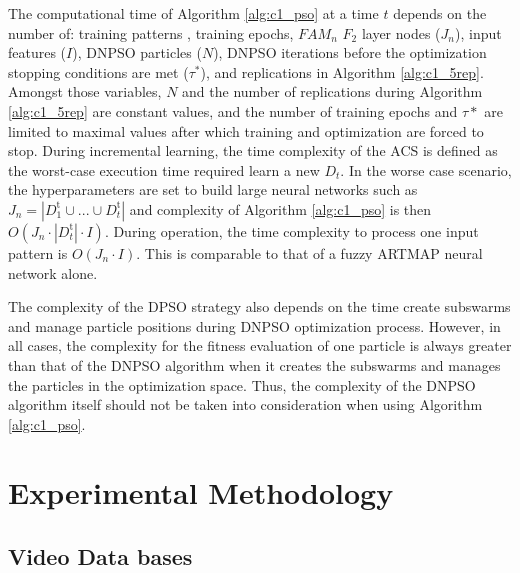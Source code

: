 The computational time of Algorithm \ref{alg:c1_pso} at a time $t$ depends on the number of: training patterns , training epochs, $\textit{FAM}_n$ $F_2$ layer nodes ($J_n$), input features ($I$), DNPSO particles ($N$), DNPSO iterations before the optimization stopping conditions are met ($\tau^*$), and replications in Algorithm \ref{alg:c1_5rep}. Amongst those variables, $N$ and the number of replications during Algorithm \ref{alg:c1_5rep} are constant values, and the number of training epochs and $\tau*$ are limited to maximal values after which training and optimization are forced to stop. During incremental learning, the time complexity of the ACS is defined as the worst-case execution time required learn a new $D_t$. In the worse case scenario, the hyperparameters are set to build large neural networks such as $J_n = |D_1^\text{t}\cup ...\cup D_t^\text{t}|$ and complexity of Algorithm \ref{alg:c1_pso} is then $O(J_n \cdot |D_t^\text{t}| \cdot I)$.
During operation, the time complexity to process one input pattern is $O(J_n \cdot I)$. This is comparable to that of a fuzzy ARTMAP neural network alone.

The complexity of the DPSO strategy also depends on the time create subswarms and manage particle positions during DNPSO optimization process. However, in all cases, the complexity for the fitness evaluation of one particle is always greater than that of the DNPSO algorithm when it creates the subswarms and manages the particles in the optimization space. Thus, the complexity of the DNPSO algorithm itself should not be taken into consideration when using Algorithm \ref{alg:c1_pso}.

\section{Experimental Methodology}
\label{sec:c1_methodology}

\subsection{Video Data bases}
\label{sec:c1_db}


